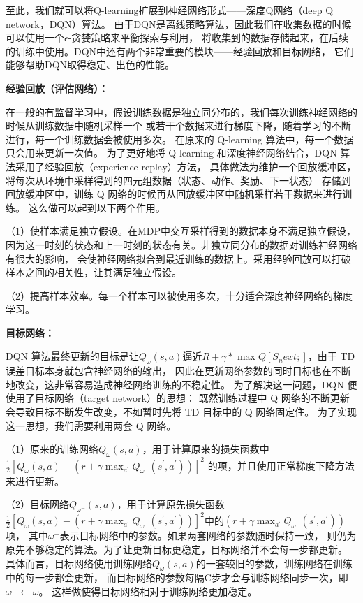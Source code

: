 \documentclass{thuemp}
\begin{document}
至此，我们就可以将Q-learning扩展到神经网络形式——深度Q网络（deep Q network，DQN）算法。
由于DQN是离线策略算法，因此我们在收集数据的时候可以使用一个$\epsilon$-贪婪策略来平衡探索与利用，
将收集到的数据存储起来，在后续的训练中使用。DQN中还有两个非常重要的模块——经验回放和目标网络，
它们能够帮助DQN取得稳定、出色的性能。

\textbf{经验回放（评估网络）：}

在一般的有监督学习中，假设训练数据是独立同分布的，我们每次训练神经网络的时候从训练数据中随机采样一个
或若干个数据来进行梯度下降，随着学习的不断进行，每一个训练数据会被使用多次。
在原来的 Q-learning 算法中，每一个数据只会用来更新一次值。
为了更好地将 Q-learning 和深度神经网络结合，DQN 算法采用了经验回放（experience replay）方法，
具体做法为维护一个回放缓冲区，将每次从环境中采样得到的四元组数据（状态、动作、奖励、下一状态）
存储到回放缓冲区中，训练 Q 网络的时候再从回放缓冲区中随机采样若干数据来进行训练。
这么做可以起到以下两个作用。

（1）使样本满足独立假设。在MDP中交互采样得到的数据本身不满足独立假设，
因为这一时刻的状态和上一时刻的状态有关。非独立同分布的数据对训练神经网络有很大的影响，
会使神经网络拟合到最近训练的数据上。采用经验回放可以打破样本之间的相关性，让其满足独立假设。

（2）提高样本效率。每一个样本可以被使用多次，十分适合深度神经网络的梯度学习。

\textbf{目标网络：}

DQN 算法最终更新的目标是让$Q_{\omega}(s, a)$逼近$R+\gamma*\max Q[S_next;]$，由于 TD 误差目标本身就包含神经网络的输出，
因此在更新网络参数的同时目标也在不断地改变，这非常容易造成神经网络训练的不稳定性。
为了解决这一问题，DQN 便使用了目标网络（target network）的思想：
既然训练过程中 Q 网络的不断更新会导致目标不断发生改变，不如暂时先将 TD 目标中的 Q 网络固定住。
为了实现这一思想，我们需要利用两套 Q 网络。

（1）原来的训练网络$Q_{\omega}(s, a)$，用于计算原来的损失函数中$\frac12[Q_{\omega}\left(s,a\right)-\left(r+\gamma\max_{a^{\prime}}Q_{\omega^{-}}\left(s^{\prime},a^{\prime}\right)\right)]^{2}$
的项，并且使用正常梯度下降方法来进行更新。

（2）目标网络$Q_{\omega^{-}}(s,a)$，用于计算原先损失函数$\frac12[Q_{\omega}\left(s,a\right)-\left(r+\gamma\max_{a^{\prime}}Q_{\omega^{-}}\left(s^{\prime},a^{\prime}\right)\right)]^{2}$中的$(r+\gamma\max_{a^{\prime}}Q_{\omega^-}\left(s^{\prime},a^{\prime}\right))$项，
其中$\omega^{-}$表示目标网络中的参数。如果两套网络的参数随时保持一致，
则仍为原先不够稳定的算法。为了让更新目标更稳定，目标网络并不会每一步都更新。
具体而言，目标网络使用训练网络$Q_{\omega}(s, a)$的一套较旧的参数，训练网络在训练中的每一步都会更新，
而目标网络的参数每隔C步才会与训练网络同步一次，即$\omega^{-}\leftarrow\omega $。
这样做使得目标网络相对于训练网络更加稳定。
\end{document}
